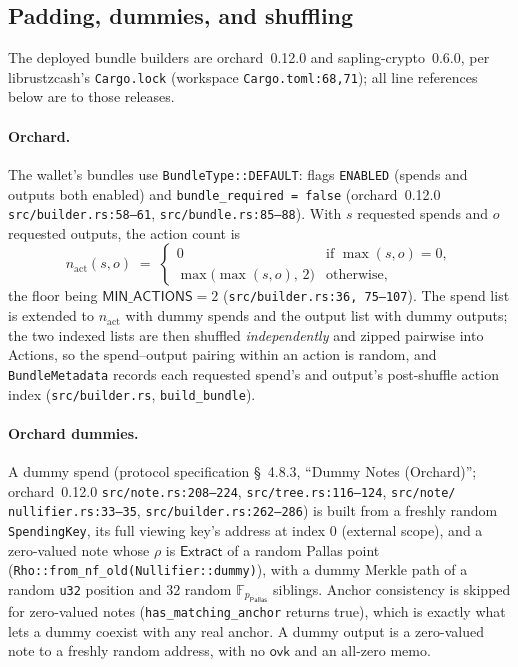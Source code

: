 \documentclass[11pt,a4paper]{article}
\theoremstyle{definition}
\newcommand{\F}{\mathbb{F}}
\newcommand{\Pallas}{\ensuremath{\mathsf{Pallas}}}
\newcommand{\Extract}{\ensuremath{\mathsf{Extract}}}
\newcommand{\ovk}{\ensuremath{\mathsf{ovk}}}
\begin{document}
\subsection{Padding, dummies, and shuffling}\label{sec:pipeline-padding}

The deployed bundle builders are \textsf{orchard}~0.12.0 and
\textsf{sapling-crypto}~0.6.0, per \textsf{librustzcash}'s
\texttt{Cargo.lock} (workspace \texttt{Cargo.toml:68,71}); all line
references below are to those releases.

\paragraph{Orchard.} The wallet's bundles use \texttt{BundleType::DEFAULT}:
flags \texttt{ENABLED} (spends and outputs both enabled) and
\texttt{bundle\_required = false}
(\textsf{orchard}~0.12.0 \texttt{src/builder.rs:58--61},
\texttt{src/bundle.rs:85--88}). With $s$ requested spends and $o$ requested
outputs, the action count is
\[
n_{\mathrm{act}}(s, o) \;=\;
\begin{cases}
0 & \text{if } \max(s, o) = 0,\\[2pt]
\max\bigl(\max(s, o),\, 2\bigr) & \text{otherwise},
\end{cases}
\]
the floor being $\mathsf{MIN\_ACTIONS} = 2$
(\texttt{src/builder.rs:36, 75--107}). The spend list is extended to
$n_{\mathrm{act}}$ with dummy spends and the output list with dummy outputs;
the two indexed lists are then shuffled \emph{independently} and zipped
pairwise into Actions, so the spend--output pairing within an action is
random, and \texttt{BundleMetadata} records each requested spend's and
output's post-shuffle action index (\texttt{src/builder.rs},
\texttt{build\_bundle}).

\paragraph{Orchard dummies.} A dummy spend (protocol specification
\S~4.8.3, ``Dummy Notes (Orchard)'';
\textsf{orchard}~0.12.0 \texttt{src/note.rs:208--224},
\texttt{src/tree.rs:116--124}, \texttt{src/note/}\allowbreak%
\texttt{nullifier.rs:33--35},
\texttt{src/builder.rs:262--286}) is built from a freshly random
\texttt{SpendingKey}, its full viewing key's address at index $0$ (external
scope), and a zero-valued note whose $\rho$ is
$\Extract$ of a random Pallas point
(\texttt{Rho::from\_nf\_old(Nullifier::dummy)}), with a dummy Merkle path of
a random \texttt{u32} position and $32$ random $\F_{p_{\Pallas}}$ siblings.
Anchor consistency is skipped for zero-valued notes
(\texttt{has\_matching\_anchor} returns true), which is exactly what lets a
dummy coexist with any real anchor. A dummy output is a zero-valued note to
a freshly random address, with no $\ovk$ and an all-zero memo.
\end{document}
